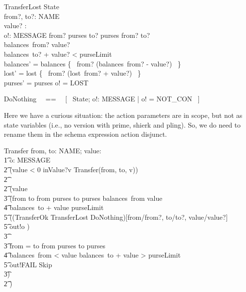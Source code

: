 \documentclass{article}
\begin{document}
\begin{schema}{TransferLost}
   \Delta State \\
   from?, to?: NAME \\
   value? : \nat \\
   o!: MESSAGE
\where
   from? \in purses \land  to? \in purses \land from? \neq to? \\
   balances~from? \geq value? \\
   balances~to? + value? < purseLimit \\
   balances' = balances \oplus \{~ from? \mapsto (balances~from? - value?) ~\} \\   
   lost' = lost  \oplus \{~ from? \mapsto (lost~from? + value?) ~\} \\
   purses' = purses \land o! = LOST
\end{schema}

\begin{zed}
   DoNothing ~~==~~ [~ \Xi State; o!: MESSAGE | o! = NOT\_CON ~]
\end{zed}

Here we have a curious situation: the action parameters are in scope, but not 
as state variables (i.e., no version with prime, shierk and pling). So, we do need
to rename them in the schema expression action disjunct.
%
\begin{circusaction}
    Transfer \circdef from, to: NAME; value: \nat \circspot \\
    	\t1 \circvar o: MESSAGE \circspot \\
		\t2 (\lcircguard value < 0 \rcircguard \circguard inValue?v \then Transfer(from, to, v)) \\
		\t2 \extchoice \\
		\t2 (\lcircguard value  \rcircguard \circguard \\
			\t3 (\lcircguard from \neq to \land from \in purses \land to \in purses \land balances~from \geq value \\
				\t4 \land balances~to + value \leq purseLimit \rcircguard \circguard \\
					\t5 (\lschexpract (TransferOk \lor TransferLost \lor DoNothing)[from/from?, to/to?, value/value?] \rschexpract \circseq \\
					\t5 out!o \then \Skip) \\
			\t3 \extchoice \\
			 \t3  \lcircguard from = to \lor from \notin purses \lor to \notin purses \lor \\
			 	\t4  balances~from < value \lor balances~to + value > purseLimit \rcircguard \circguard \\
					\t5 out!FAIL \then Skip \\
			 \t3) \\
	        \t2 )
\end{circusaction}
\end{document}
